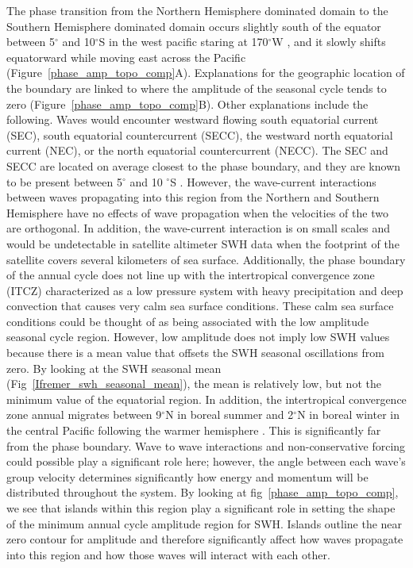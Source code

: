 \documentclass[draft,linenumbers]{agujournal2018}
\begin{document}
The phase transition from the Northern Hemisphere dominated domain to the Southern Hemisphere dominated domain occurs slightly south of the equator between 5$^{\circ}$ and 10$^{\circ}$S in the west pacific staring at 170$^{\circ}$W , and it slowly shifts equatorward while moving east across the Pacific (Figure~\ref{phase_amp_topo_comp}A). Explanations for the geographic location of the boundary are linked to where the amplitude of the seasonal cycle tends to zero (Figure~\ref{phase_amp_topo_comp}B). Other explanations include the following. Waves would encounter westward flowing south equatorial current (SEC), south equatorial countercurrent (SECC), the westward north equatorial current (NEC), or the north equatorial countercurrent (NECC). The SEC and SECC are located on average closest to the phase boundary, and they are known to be present between 5$^{\circ}$ and 10 $^{\circ}$S \cite{talley2011descriptive}. However, the wave-current interactions between waves propagating into this region from the Northern and Southern Hemisphere have no effects of wave propagation when the velocities of the two are orthogonal. In addition, the wave-current interaction is on small scales and would be undetectable in satellite altimeter SWH data when the footprint of the satellite covers several kilometers of sea surface. Additionally, the phase boundary of the annual cycle does not line up with the intertropical convergence zone (ITCZ) characterized as a low pressure system with heavy precipitation and deep convection \cite{schneider2014migrations} that causes very calm sea surface conditions. These calm sea surface conditions could be thought of as being associated with the low amplitude seasonal cycle region. However, low amplitude does not imply low SWH values because there is a mean value that offsets the SWH seasonal oscillations from zero. By looking at the SWH seasonal mean (Fig~\ref{Ifremer_swh_seasonal_mean}), the mean is relatively low, but not the minimum value of the equatorial region. In addition, the intertropical convergence zone annual migrates between 9$^{\circ}$N in boreal summer and 2$^{\circ}$N in boreal winter in the central Pacific following the warmer hemisphere \cite{schneider2014migrations}. This is significantly far from the phase boundary. Wave to wave interactions and non-conservative forcing could possible play a significant role here; however, the angle between each wave's group velocity determines significantly how energy and momentum will be distributed throughout the system. By looking at fig~\ref{phase_amp_topo_comp}, we see that islands within this region play a significant role in setting the shape of the minimum annual cycle amplitude region for SWH. Islands outline the near zero contour for amplitude and therefore significantly affect how waves propagate into this region and how those waves will interact with each other. 
\end{document}
